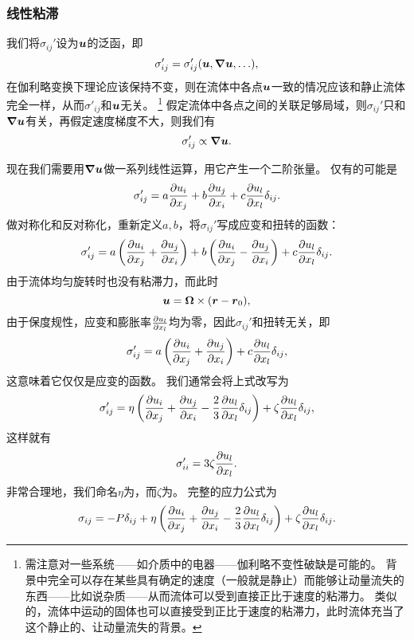 \subsubsection{线性粘滞}

我们将$\sigma_{ij}'$设为$\vb*{u}$的泛函，即
\[
    \sigma_{ij}' = \sigma_{ij}'(\vb*{u}, \grad{\vb*{u}}, \ldots),
\]
在伽利略变换下理论应该保持不变，则在流体中各点$\vb*{u}$一致的情况应该和静止流体完全一样，从而$\sigma'_{ij}$和$\vb*{u}$无关。%
\footnote{
    需注意对一些系统——如介质中的电器——伽利略不变性破缺是可能的。
    背景中完全可以存在某些具有确定的速度（一般就是静止）而能够让动量流失的东西——比如说杂质——从而流体可以受到直接正比于速度的粘滞力。
    类似的，流体中运动的固体也可以直接受到正比于速度的粘滞力，此时流体充当了这个静止的、让动量流失的背景。
}%
假定流体中各点之间的关联足够局域，则$\sigma_{ij}'$只和$\grad{\vb*{u}}$有关，再假定速度梯度不大，则我们有
\[
    \sigma_{ij}' \propto \grad{\vb*{u}}.
\]

现在我们需要用$\grad{\vb*{u}}$做一系列线性运算，用它产生一个二阶张量。
仅有的可能是
\[
    \sigma_{ij}' = a \pdv{u_i}{x_j} + b \pdv{u_j}{x_i} + c \pdv{u_l}{x_l} \delta_{ij}.
\]
做对称化和反对称化，重新定义$a, b$，将$\sigma_{ij}'$写成应变和扭转的函数：
\[
    \sigma_{ij}' = a \left( \pdv{u_i}{x_j} + \pdv{u_j}{x_i} \right) + b \left( \pdv{u_i}{x_j} - \pdv{u_j}{x_i} \right) + c \pdv{u_l}{x_l} \delta_{ij}.
\]
由于流体均匀旋转时也没有粘滞力，而此时
\[
    \vb*{u} = \vb*{\Omega} \times (\vb*{r} - \vb*{r}_0),
\]
由于保度规性，应变和膨胀率$\pdv{u_l}{x_l}$均为零，因此$\sigma_{ij}'$和扭转无关，即
\[
    \sigma_{ij}' = a \left( \pdv{u_i}{x_j} + \pdv{u_j}{x_i} \right) + c \pdv{u_l}{x_l} \delta_{ij},
\]
这意味着它仅仅是应变的函数。
我们通常会将上式改写为
\begin{equation}
    \sigma_{ij}' = \eta \left( \pdv{u_i}{x_j} + \pdv{u_j}{x_i} - \frac{2}{3} \pdv{u_l}{x_l} \delta_{ij} \right) + \zeta \pdv{u_l}{x_l} \delta_{ij},
    \label{eq:stress-and-deform-linear}
\end{equation}
这样就有
\begin{equation}
    \sigma'_{ii} = 3 \zeta \pdv{u_l}{x_l}.
\end{equation}
非常合理地，我们命名$\eta$为，而$\zeta$为。
完整的应力公式为
\begin{equation}
    \sigma_{ij} = - P \delta_{ij} + \eta \left( \pdv{u_i}{x_j} + \pdv{u_j}{x_i} - \frac{2}{3} \pdv{u_l}{x_l} \delta_{ij} \right) + \zeta \pdv{u_l}{x_l} \delta_{ij}.
    \label{eq:newtonian-stress-general}
\end{equation}

